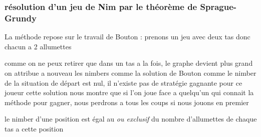 \documentclass{beamer}
\begin{document}
  \begin{frame}
  \frametitle{résolution d'un jeu de Nim par le théorème de Sprague-Grundy}
     {La méthode repose sur le travail de Bouton : prenons un jeu avec deux tas donc chacun a 2 allumettes}

     {comme on ne peux retirer que dans un tas a la fois, le graphe devient plus grand}
     {on attribue a nouveau les nimbers comme la solution de Bouton}
     {comme le nimber de la situation de départ est nul, il n'existe pas de stratégie gagnante pour ce joueur}
     {cette solution nous montre que si l'on joue face a quelqu'un qui connait la méthode pour gagner, nous perdrons a tous les coups si nous jouons en premier}
     {
      \begin{figure}[h]
        \centering
      \end{figure}
    }


     {le nimber d'une position est égal au \textit{ou exclusif} du nombre d'allumettes de chaque tas a cette position}
  \end{frame}
\end{document}
